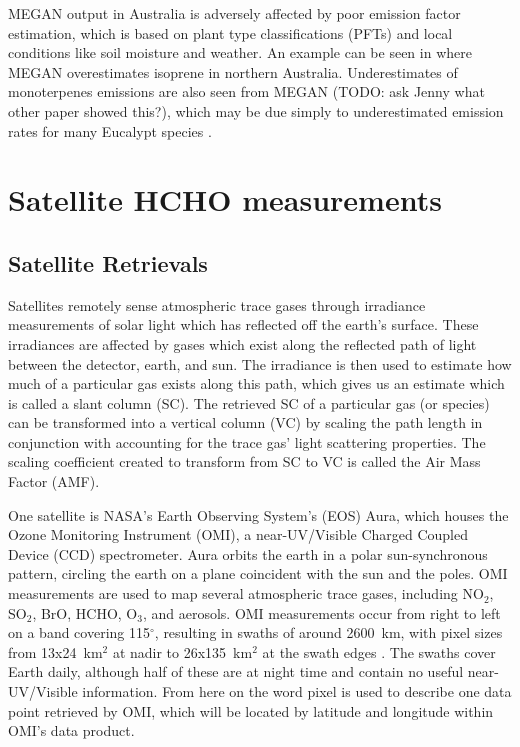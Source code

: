     MEGAN output in Australia is adversely affected by poor emission factor estimation, which is based on plant type classifications (PFTs) and local conditions like soil moisture and weather. 
    An example can be seen in \citet{Muller2008} where MEGAN overestimates isoprene in northern Australia.
    Underestimates of monoterpenes emissions are also seen from MEGAN (TODO: ask Jenny what other paper showed this?), which may be due simply to underestimated emission rates for many Eucalypt species \citep{Winters2009}.
    

\section{Satellite HCHO measurements}
\label{ch_HCHO:sec:satelliteHCHO}
  \subsection{Satellite Retrievals}
    Satellites remotely sense atmospheric trace gases through irradiance measurements of solar light which has reflected off the earth's surface. 
    These irradiances are affected by gases which exist along the reflected path of light between the detector, earth, and sun. 
    The irradiance is then used to estimate how much of a particular gas exists along this path, which gives us an estimate which is called a slant column (SC).
    The retrieved SC of a particular gas (or species) can be transformed into a vertical column (VC) by scaling the path length in conjunction with accounting for the trace gas' light scattering properties.
    The scaling coefficient created to transform from SC to VC is called the Air Mass Factor (AMF).

    One satellite is NASA's Earth Observing System's (EOS) Aura, which houses the Ozone Monitoring Instrument (OMI), a near-UV/Visible Charged Coupled Device (CCD) spectrometer.
    Aura orbits the earth in a polar sun-synchronous pattern, circling the earth on a plane coincident with the sun and the poles. 
    OMI measurements are used to map several atmospheric trace gases, including NO$_2$, SO$_2$, BrO, HCHO, O$_3$, and aerosols.
    OMI measurements occur from right to left on a band covering 115$^{\circ}$, resulting in swaths of around 2600~km, with pixel sizes from 13x24~km$^2$ at nadir to 26x135~km$^2$ at the swath edges \citep{Abad2015}.
    The swaths cover Earth daily, although half of these are at night time and contain no useful near-UV/Visible information.
    From here on the word pixel is used to describe one data point retrieved by OMI, which will be located by latitude and longitude within OMI's data product.
    
